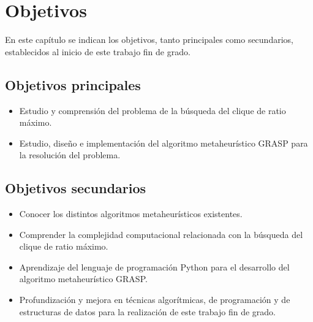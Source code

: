
\chapter{Objetivos} %

\label{Chapter2}



En este capítulo se indican los objetivos, tanto principales como secundarios, establecidos al inicio de este trabajo fin de grado.

\section{Objetivos principales}
\begin{itemize}
	\item Estudio y comprensión del problema de la búsqueda del clique de ratio máximo.
	\item Estudio, diseño e implementación del algoritmo metaheurístico GRASP para la resolución del problema.
\end{itemize}

\section{Objetivos secundarios}
\begin{itemize}
	\item Conocer los distintos algoritmos metaheurísticos existentes.
	\item Comprender la complejidad computacional relacionada con la búsqueda del clique de ratio máximo.
	\item Aprendizaje del lenguaje de programación Python para el desarrollo del algoritmo metaheurístico GRASP.
	\item Profundización y mejora en técnicas algorítmicas, de programación y de estructuras de datos para la realización de este trabajo fin de grado.
\end{itemize}

